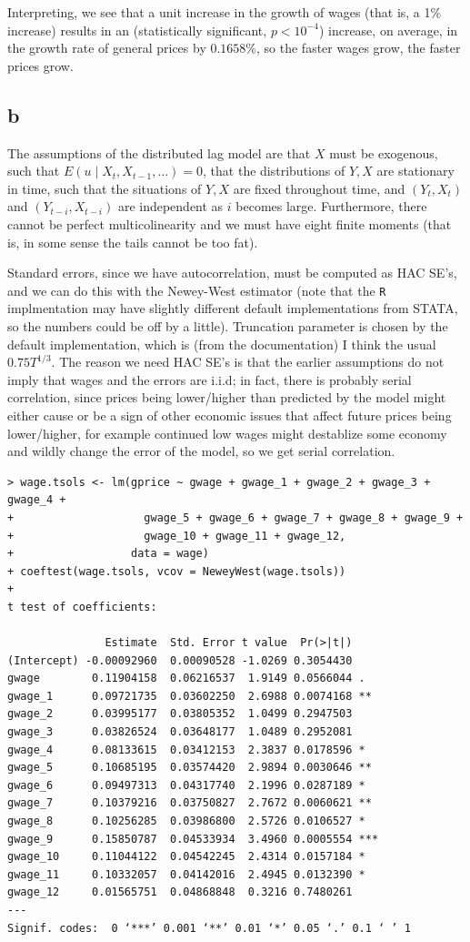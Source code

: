 \documentclass[12pt,letterpaper]{article}
\theoremstyle{definition}
\begin{document}
Interpreting, we see that a unit increase in the growth of wages (that is, a 1\% increase) results in an (statistically significant, $p < 10^{-4}$) increase, on average, in the growth rate of general prices by $0.1658\%$, so the faster wages grow, the faster prices grow.

\subsection*{b}

The assumptions of the distributed lag model are that $X$ must be exogenous, such that $E(u \mid X_{t}, X_{t-1}, \dots) = 0$, that the distributions of $Y, X$ are stationary in time, such that the situations of $Y, X$ are fixed throughout time, and $(Y_{t}, X_{t})$ and $(Y_{t-i}, X_{t-i})$ are independent as $i$ becomes large. Furthermore, there cannot be perfect multicolinearity and we must have eight finite moments (that is, in some sense the tails cannot be too fat).

Standard errors, since we have autocorrelation, must be computed as HAC SE's, and we can do this with the Newey-West estimator (note that the \verb|R| implmentation may have slightly different default implementations from STATA, so the numbers could be off by a little). Truncation parameter is chosen by the default implementation, which is (from the documentation) I think the usual $0.75T^{1/3}$. The reason we need HAC SE's is that the earlier assumptions do not imply that wages and the errors are i.i.d; in fact, there is probably serial correlation, since prices being lower/higher than predicted by the model might either cause or be a sign of other economic issues that affect future prices being lower/higher, for example continued low wages might destablize some economy and wildly change the error of the model, so we get serial correlation.
\begin{Verbatim}[fontsize=\small]
> wage.tsols <- lm(gprice ~ gwage + gwage_1 + gwage_2 + gwage_3 + gwage_4 +
+                    gwage_5 + gwage_6 + gwage_7 + gwage_8 + gwage_9 +
+                    gwage_10 + gwage_11 + gwage_12,
+                  data = wage)
+ coeftest(wage.tsols, vcov = NeweyWest(wage.tsols))
+
t test of coefficients:

               Estimate  Std. Error t value  Pr(>|t|)
(Intercept) -0.00092960  0.00090528 -1.0269 0.3054430
gwage        0.11904158  0.06216537  1.9149 0.0566044 .
gwage_1      0.09721735  0.03602250  2.6988 0.0074168 **
gwage_2      0.03995177  0.03805352  1.0499 0.2947503
gwage_3      0.03826524  0.03648177  1.0489 0.2952081
gwage_4      0.08133615  0.03412153  2.3837 0.0178596 *
gwage_5      0.10685195  0.03574420  2.9894 0.0030646 **
gwage_6      0.09497313  0.04317740  2.1996 0.0287189 *
gwage_7      0.10379216  0.03750827  2.7672 0.0060621 **
gwage_8      0.10256285  0.03986800  2.5726 0.0106527 *
gwage_9      0.15850787  0.04533934  3.4960 0.0005554 ***
gwage_10     0.11044122  0.04542245  2.4314 0.0157184 *
gwage_11     0.10332057  0.04142016  2.4945 0.0132390 *
gwage_12     0.01565751  0.04868848  0.3216 0.7480261
---
Signif. codes:  0 ‘***’ 0.001 ‘**’ 0.01 ‘*’ 0.05 ‘.’ 0.1 ‘ ’ 1
\end{Verbatim}
\end{document}
